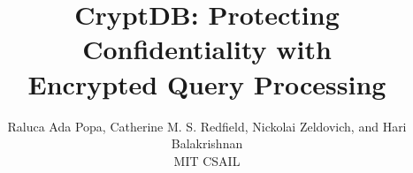 \documentclass[9pt,twocolumn]{article}
\begin{document}
\title{\bf CryptDB: Protecting Confidentiality with \\
	   Encrypted Query Processing}
\author{Raluca Ada Popa, Catherine M. S. Redfield,
	Nickolai Zeldovich, and Hari Balakrishnan \\
	MIT CSAIL}
\date{}

\newcommand{\RND}{\textrm{RND}}
\newcommand{\DET}{\textrm{DET}}
\newcommand{\OPE}{\textrm{OPE}}
\newcommand{\OPEJOIN}{\textrm{OPE-JOIN}}
\newcommand{\HOM}{\textrm{HOM}}
\newcommand{\JOIN}{\textrm{JOIN}}
\newcommand{\SEARCH}{\textrm{SEARCH}}

\newcommand{\up}{\texttt{UPDATE}}
\newcommand{\ins}{\texttt{INSERT}}
\newcommand{\del}{\texttt{DELETE}}
\newcommand{\sel}{\texttt{SELECT}}

\newcommand{\rap}[1]{\textcolor{blue}{RAP: #1}}
\newcommand{\hb}[1]{\textcolor{red}{HB: #1}}
\newcommand{\nz}[1]{\textcolor{magenta}{NZ: #1}}
\newcommand{\cmsr}[1]{\textcolor{green}{CR: #1}}
\newcommand{\todo}[1]{\textcolor{red}{#1}}


\newcommand{\tput}{27\%}

\newtheorem{definition}{Definition}
\newtheorem{theorem}{Theorem}

\maketitle







 





{
\scriptsize
\setlength{\bibsep}{3pt}


}
\end{document}
